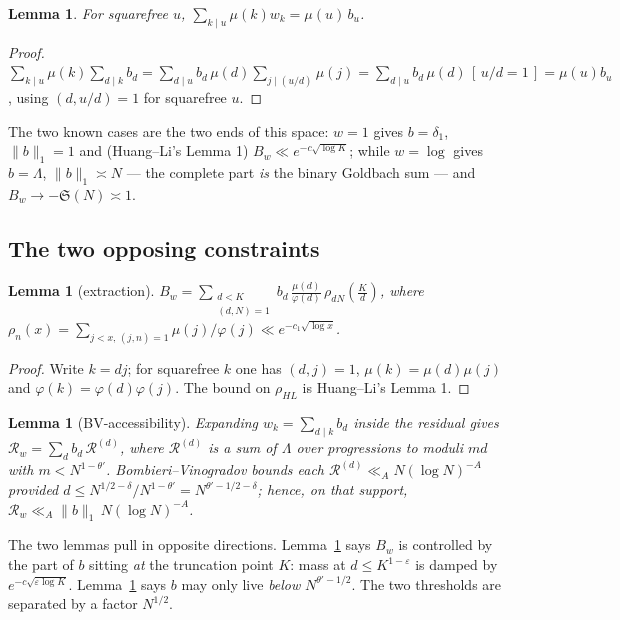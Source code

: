 \documentclass[11pt,a4paper]{article}
\theoremstyle{plain}
\newtheorem{lemma}[theorem]{Lemma}
\theoremstyle{definition}
\renewcommand{\SS}{\mathfrak{S}}
\begin{document}
\begin{lemma}\label{lem:Gb}
For squarefree $u$,
$\sum_{k\mid u}\mu(k)w_k = \mu(u)\,b_u$.
\end{lemma}

\begin{proof}
$\sum_{k\mid u}\mu(k)\sum_{d\mid k}b_d
 = \sum_{d\mid u}b_d\,\mu(d)\sum_{j\mid (u/d)}\mu(j)
 = \sum_{d\mid u}b_d\,\mu(d)\,[\,u/d=1\,] = \mu(u)b_u$,
using $(d,u/d)=1$ for squarefree $u$.
\end{proof}

The two known cases are the two ends of this space: $w=1$ gives
$b=\delta_1$, $\|b\|_1 = 1$ and (Huang--Li's Lemma 1)
$B_w\ll e^{-c\sqrt{\log K}}$; while $w=\log$ gives $b=\Lambda$,
$\|b\|_1\asymp N$ --- the complete part \emph{is} the binary Goldbach
sum --- and $B_w\to-\SS(N)\asymp1$.

\subsection{The two opposing constraints}

\begin{lemma}[extraction]\label{lem:extract}
$\displaystyle B_w=\sum_{\substack{d<K\\(d,N)=1}}b_d\,
 \frac{\mu(d)}{\varphi(d)}\,\rho_{dN}\!\left(\frac{K}{d}\right)$,
where $\rho_{n}(x)=\sum_{j<x,\,(j,n)=1}\mu(j)/\varphi(j)
 \ll e^{-c_1\sqrt{\log x}}$.
\end{lemma}

\begin{proof}
Write $k=dj$; for squarefree $k$ one has $(d,j)=1$,
$\mu(k)=\mu(d)\mu(j)$ and $\varphi(k)=\varphi(d)\varphi(j)$. The bound
on $\rho_{HL}$ is Huang--Li's Lemma 1.
\end{proof}

\begin{lemma}[BV-accessibility]\label{lem:bv}
Expanding $w_k=\sum_{d\mid k}b_d$ inside the residual gives
$\mathcal R_w=\sum_d b_d\,\mathcal R^{(d)}$, where $\mathcal R^{(d)}$
is a sum of $\Lambda$ over progressions to moduli $md$ with
$m<N^{1-\theta'}$. Bombieri--Vinogradov bounds each
$\mathcal R^{(d)}\ll_A N(\log N)^{-A}$ provided
$d\le N^{1/2-\delta}/N^{1-\theta'}=N^{\theta'-1/2-\delta}$; hence, on
that support, $\mathcal R_w\ll_A \|b\|_1\,N(\log N)^{-A}$.
\end{lemma}

The two lemmas pull in opposite directions. Lemma~\ref{lem:extract}
says $B_w$ is controlled by the part of $b$ sitting \emph{at} the
truncation point $K$: mass at $d\le K^{1-\varepsilon}$ is damped by
$e^{-c\sqrt{\varepsilon\log K}}$. Lemma~\ref{lem:bv} says $b$ may only
live \emph{below} $N^{\theta'-1/2}$. The two thresholds are separated
by a factor $N^{1/2}$.
\end{document}
